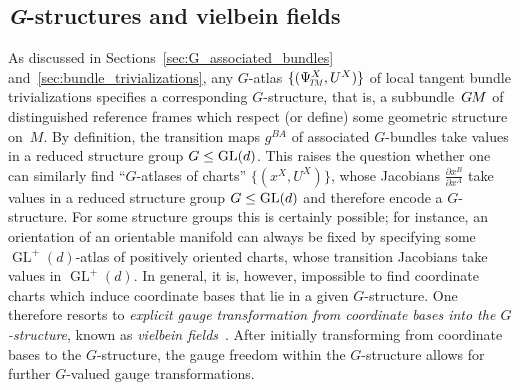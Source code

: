 \subsection{\textit{G}-structures and vielbein fields}
\label{apx:vielbein_fields}


As discussed in Sections~\ref{sec:G_associated_bundles} and~\ref{sec:bundle_trivializations}, any $G$-atlas $\{(\PsiTM^X, U^X)\}$ of local tangent bundle trivializations specifies a corresponding $G$-structure, that is, a subbundle~$G\mkern-1.4muM$ of distinguished reference frames which respect (or define) some geometric structure on~$M$.
By definition, the transition maps $g^{BA}$ of associated $G$-bundles take values in a reduced structure group $G\leq\operatorname{GL}(d)$.
This raises the question whether one can similarly find ``$G$-atlases of charts'' $\{(x^X, U^X)\}$, whose Jacobians $\frac{\partial x^B}{\partial x^A}$ take values in a reduced structure group $G \leq \operatorname{GL}(d)$ and therefore encode a $G$-structure.
For some structure groups this is certainly possible; for instance, an orientation of an orientable manifold can always be fixed by specifying some $\operatorname{GL}^+(d)$-atlas of positively oriented charts, whose transition Jacobians take values in $\operatorname{GL}^+(d)$.
In general, it is, however, impossible to find coordinate charts which induce coordinate bases that lie in a given $G$-structure.
One therefore resorts to \emph{explicit gauge transformation from coordinate bases into the $G$-structure}, known as \emph{vielbein fields}~\cite{yepez2011einstein, zhou2016gauge, nakahara2003geometry, carroll2004spacetime}.
After initially transforming from coordinate bases to the $G$-structure, the gauge freedom within the $G$-structure allows for further $G$-valued gauge transformations.


